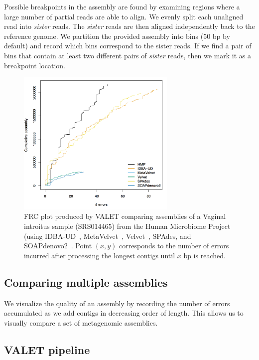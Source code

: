 \documentclass{bioinfo}
\begin{document}
Possible breakpoints in the assembly are found by examining regions where a large number of partial reads are able to align.
We evenly split each unaligned read into \emph{sister} reads.
The \emph{sister} reads are then aligned independently back to the reference genome.
We partition the provided assembly into bins (50 bp by default) and record which bins correspond to the sister reads.
If we find a pair of bins that contain at least two different pairs of \textit{sister} reads, then we mark it as a breakpoint location.

\begin{figure}[tb!]
\begin{center}
\includegraphics[width=3in]{figures/frc}
\end{center}
\caption[hmp_frc]{FRC plot produced by VALET comparing assemblies of a Vaginal introitus sample (SRS014465) from the Human Microbiome Project~\citep{human2012structure} (using IDBA-UD~\citep{peng2012idba}, MetaVelvet~\citep{namiki2012metavelvet}, Velvet~\citep{zerbino2008velvet}, SPAdes\citep{bankevich2012spades}, and SOAPdenovo2~\citep{luo2012soapdenovo2}. Point $(x,y)$ corresponds to the number of errors incurred after processing the longest contigs until $x$ bp is reached.}
\label{fig:valet_pipeline}
\end{figure}

\subsection{Comparing multiple assemblies}

We visualize the quality of an assembly by recording the number of errors accumulated as we add contigs in decreasing order of length.
This allows us to visually compare a set of metagenomic assemblies.

\subsection{VALET pipeline}
\end{document}
